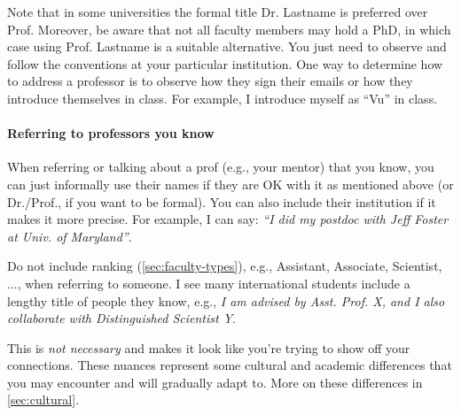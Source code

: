 \documentclass[oneside,11pt,dvipsnames]{book}
\newcommand{\mycomment}[3][\color{blue}]{{#1{{#2}: {#3}}}}
\newcommand{\tvn}[1]{\mycomment{TVN}{#1}}{}
\begin{document}
Note that in some universities the formal title Dr. Lastname is preferred over Prof. Moreover, be aware that not all faculty members may hold a PhD, in which case using Prof. Lastname is a suitable alternative. 	You just need to observe and follow the conventions at your particular institution. One way to determine how to address a professor is to observe how they sign their emails or how they introduce themselves in class. For example, I introduce myself as ``Vu'' in class.



\paragraph{Referring to professors you know} When referring or talking about a prof (e.g., your mentor) that you know, you can just informally use their names if they are OK with it as mentioned above (or Dr./Prof., if you want to be formal). You can also include their institution if it makes it more precise.  For example, I can say:  \emph{``I did my postdoc with Jeff Foster at Univ. of Maryland''}.

Do not include ranking (\autoref{sec:faculty-types}), e.g., Assistant, Associate, Scientist, ..., when referring to someone. I see many international students include a lengthy title of people they know, e.g., \emph{I am advised by Asst. Prof. X, and I also collaborate with Distinguished Scientist Y}.  

This is \emph{not necessary} and makes it look like you're trying to show off your connections. These nuances represent some cultural and academic differences that you may encounter and will gradually adapt to. More on these differences in \autoref{sec:cultural}.



\end{document}
